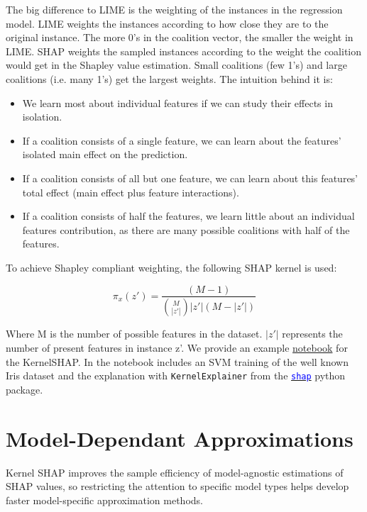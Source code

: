 The big difference to LIME is the weighting of the instances in the regression model.
LIME weights the instances according to how close they are to the original instance.
The more 0's in the coalition vector, the smaller the weight in LIME.
SHAP weights the sampled instances according to the weight the coalition would get in the Shapley value estimation.
Small coalitions (few 1's) and large coalitions (i.e. many 1's) get the largest weights.
The intuition behind it is:
\begin{itemize}
    \item We learn most about individual features if we can study their effects in isolation.
    \item If a coalition consists of a single feature, we can learn about the features' isolated main effect on the prediction.
    \item If a coalition consists of all but one feature, we can learn about this features' total effect (main effect plus feature interactions).
    \item If a coalition consists of half the features, we learn little about an individual features contribution, as there are many possible coalitions with half of the features.
\end{itemize}

To achieve Shapley compliant weighting, the following SHAP kernel is used:

$$\pi_{x}(z')=\frac{(M-1)}{\binom{M}{|z'|}|z'|(M-|z'|)}$$

Where M is the number of possible features in the dataset. $|z'|$ represents the number of present features in instance z'.
\newline
\newline
We provide an example \textcolor{blue}{\href{https://colab.research.google.com/drive/1gPHfOssujWJGIDipttj8VQZeLAt-qxy3?usp=sharing} {notebook}} for the KernelSHAP. In the notebook includes an SVM training of the well known Iris dataset and the explanation with \texttt{KernelExplainer} from the \texttt{\href{https://github.com/slundberg/shap}{\textcolor{blue}{shap}}} python package.

\section{Model-Dependant Approximations}
Kernel SHAP improves the sample efficiency of model-agnostic estimations of SHAP values, so restricting the attention to specific model types helps develop faster model-specific approximation methods.

